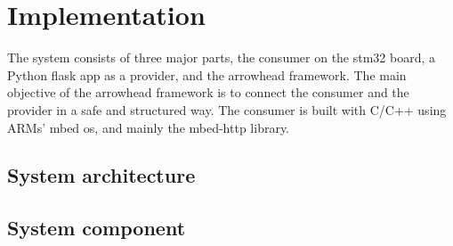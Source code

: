 \section{Implementation}
The system consists of three major parts, the consumer on the stm32 board, a Python flask app as a provider, and the arrowhead framework.
The main objective of the arrowhead framework is to connect the consumer and the provider in a safe and structured way.
The consumer is built with C/C++ using ARMs' mbed os, and mainly the mbed-http library. 

\subsection{System architecture}

\subsection{System component}
